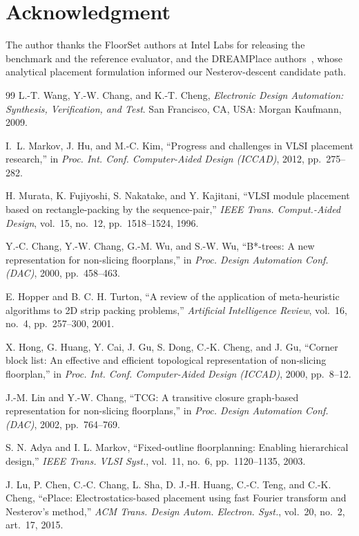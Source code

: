 \documentclass[nolineno]{ieeeaccess}
\begin{document}
\section*{Acknowledgment}
The author thanks the FloorSet authors at Intel Labs for
releasing the benchmark and the reference evaluator, and the DREAMPlace
authors~\cite{lin2019dreamplace}, whose analytical placement
formulation informed our Nesterov-descent candidate path.

\begin{thebibliography}{99}
L.-T. Wang, Y.-W. Chang, and K.-T. Cheng,
\emph{Electronic Design Automation: Synthesis, Verification, and Test}.
San Francisco, CA, USA: Morgan Kaufmann, 2009.

I.~L. Markov, J. Hu, and M.-C. Kim,
``Progress and challenges in VLSI placement research,''
in \emph{Proc. Int. Conf. Computer-Aided Design (ICCAD)}, 2012, pp.~275--282.

H. Murata, K. Fujiyoshi, S. Nakatake, and Y. Kajitani,
``VLSI module placement based on rectangle-packing by the sequence-pair,''
\emph{IEEE Trans. Comput.-Aided Design}, vol.~15, no.~12, pp.~1518--1524, 1996.

Y.-C. Chang, Y.-W. Chang, G.-M. Wu, and S.-W. Wu,
``B*-trees: A new representation for non-slicing floorplans,''
in \emph{Proc. Design Automation Conf. (DAC)}, 2000, pp.~458--463.

E. Hopper and B. C. H. Turton,
``A review of the application of meta-heuristic algorithms to 2D strip packing problems,''
\emph{Artificial Intelligence Review}, vol.~16, no.~4, pp.~257--300, 2001.

X. Hong, G. Huang, Y. Cai, J. Gu, S. Dong, C.-K. Cheng, and J. Gu,
``Corner block list: An effective and efficient topological representation of non-slicing floorplan,''
in \emph{Proc. Int. Conf. Computer-Aided Design (ICCAD)}, 2000, pp.~8--12.

J.-M. Lin and Y.-W. Chang,
``TCG: A transitive closure graph-based representation for non-slicing floorplans,''
in \emph{Proc. Design Automation Conf. (DAC)}, 2002, pp.~764--769.

S. N. Adya and I. L. Markov,
``Fixed-outline floorplanning: Enabling hierarchical design,''
\emph{IEEE Trans. VLSI Syst.}, vol.~11, no.~6, pp.~1120--1135, 2003.

J. Lu, P. Chen, C.-C. Chang, L. Sha, D. J.-H. Huang, C.-C. Teng, and C.-K. Cheng,
``ePlace: Electrostatics-based placement using fast Fourier transform and Nesterov's method,''
\emph{ACM Trans. Design Autom. Electron. Syst.}, vol.~20, no.~2, art.~17, 2015.


\end{thebibliography}
\end{document}
